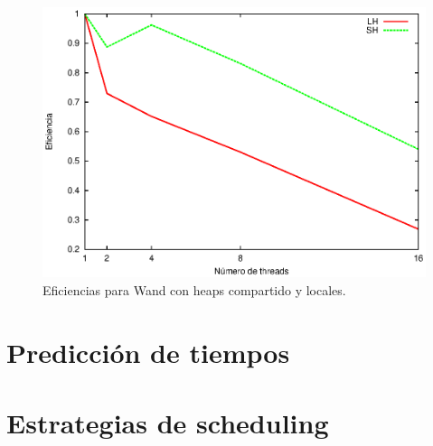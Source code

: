 \begin{figure}[!ht]
\centering
\includegraphics[scale=.75]{images/eficiencias_wand.eps}
\caption{Eficiencias para Wand con heaps compartido y locales.}
\label{fig:eficiencias_wand}
\end{figure}

\section{Predicción de tiempos}
\label{evaluacionexperimental:predicciontiempos}


\section{Estrategias de scheduling}
\label{evaluacionexperimental:estrategiasscheduling}